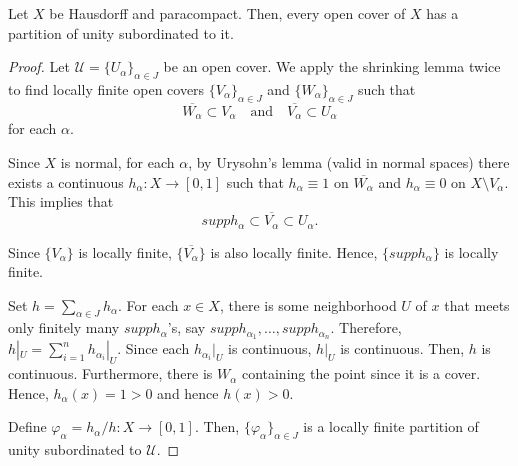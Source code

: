 \begin{theorem}
    Let \(X\) be Hausdorff and paracompact. Then, every open cover of \(X\) has a partition of unity subordinated to it.
\end{theorem}
\begin{proof}
    Let \(\mathcal U=\{U_\alpha\}_{\alpha\in J}\) be an open cover. We apply the shrinking lemma twice to find locally finite open covers \(\{V_\alpha\}_{\alpha\in J}\) and \(\{W_\alpha\}_{\alpha\in J}\) such that
    \[\overline{W_\alpha}\subset V_\alpha \quad\text{and}\quad \overline{V_\alpha}\subset U_\alpha\]
    for each \(\alpha\).

    Since $X$ is normal, for each \(\alpha\), by Urysohn’s lemma (valid in normal spaces) there exists a continuous \(h_\alpha:X\to[0,1]\) such that
    \(h_\alpha\equiv 1\) on \(\overline{W_\alpha}\) and \( h_\alpha\equiv 0\) on \(X \setminus V_\alpha\).
    This implies that 
    \[supp h_\alpha \subset \overline{V_\alpha}\subset U_\alpha.\]

    Since \(\{V_\alpha\}\) is locally finite, $\{\overline{V_\alpha}\}$ is also locally finite. Hence, $\{supp h_\alpha\}$ is locally finite.


    Set \(h=\sum_{\alpha\in J} h_\alpha\).
    For each $x\in X$, there is some neighborhood $U$ of $x$ that meets only finitely many $supp h_\alpha$'s, say $supp h_{\alpha_1},\ldots,supp h_{\alpha_n}$. Therefore, $h|_U=\sum_{i=1}^nh_{\alpha_i}|_U$. Since each $h_{\alpha_i}|_U$ is continuous, $h|_U$ is continuous. Then, $h$ is continuous.
    Furthermore, there is $W_\alpha$ containing the point since it is a cover. Hence, $h_\alpha(x)=1>0$ and hence $h(x)>0$.

    
    Define \(\varphi_\alpha=h_\alpha/h:X\to[0,1]\). Then, \(\{\varphi_\alpha\}_{\alpha\in J}\) is a locally finite partition of unity subordinated to \(\mathcal U\). 
\end{proof}


\newpage

